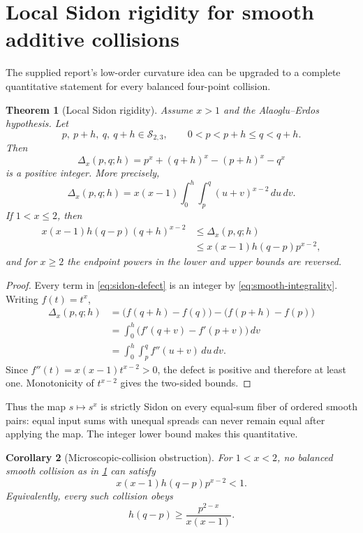 \documentclass[11pt]{article}
\newtheorem{theorem}{Theorem}[section]
\newtheorem{corollary}[theorem]{Corollary}
\theoremstyle{definition}
\theoremstyle{remark}
\newcommand{\Ssmooth}{\mathcal S_{2,3}}
\begin{document}
\section{Local Sidon rigidity for smooth additive collisions}\label{sec:sidon}

The supplied report's low-order curvature idea can be upgraded to a complete quantitative statement for every balanced four-point collision.

\begin{theorem}[Local Sidon rigidity]\label{thm:local-sidon}
Assume $x>1$ and the Alaoglu--Erdos hypothesis. Let
\[
 p,\ p+h,\ q,\ q+h\in\Ssmooth,
 \qquad 0<p<p+h\le q<q+h.
\]
Then
\begin{equation}\label{eq:sidon-defect}
 \Delta_x(p,q;h)=p^x+(q+h)^x-(p+h)^x-q^x
\end{equation}
is a positive integer. More precisely,
\begin{equation}\label{eq:double-integral}
 \Delta_x(p,q;h)=x(x-1)
 \int_0^h\int_p^q (u+v)^{x-2}\,du\,dv.
\end{equation}
If $1<x\le2$, then
\begin{align}
 x(x-1)h(q-p)(q+h)^{x-2}
 &\le \Delta_x(p,q;h)\nonumber\\
 &\le x(x-1)h(q-p)p^{x-2},\label{eq:sidon-bounds-low}
\end{align}
and for $x\ge2$ the endpoint powers in the lower and upper bounds are reversed.
\end{theorem}

\begin{proof}
Every term in \eqref{eq:sidon-defect} is an integer by \eqref{eq:smooth-integrality}. Writing $f(t)=t^x$,
\begin{align*}
 \Delta_x(p,q;h)
 &=\bigl(f(q+h)-f(q)\bigr)-\bigl(f(p+h)-f(p)\bigr)\\
 &=\int_0^h\bigl(f'(q+v)-f'(p+v)\bigr)\,dv\\
 &=\int_0^h\int_p^q f''(u+v)\,du\,dv.
\end{align*}
Since $f''(t)=x(x-1)t^{x-2}>0$, the defect is positive and therefore at least one. Monotonicity of $t^{x-2}$ gives the two-sided bounds.
\end{proof}

Thus the map $s\mapsto s^x$ is strictly Sidon on every equal-sum fiber of ordered smooth pairs: equal input sums with unequal spreads can never remain equal after applying the map. The integer lower bound makes this quantitative.

\begin{corollary}[Microscopic-collision obstruction]
For $1<x<2$, no balanced smooth collision as in \cref{thm:local-sidon} can satisfy
\[
 x(x-1)h(q-p)p^{x-2}<1.
\]
Equivalently, every such collision obeys
\[
 h(q-p)\ge \frac{p^{2-x}}{x(x-1)}.
\]
\end{corollary}
\end{document}
